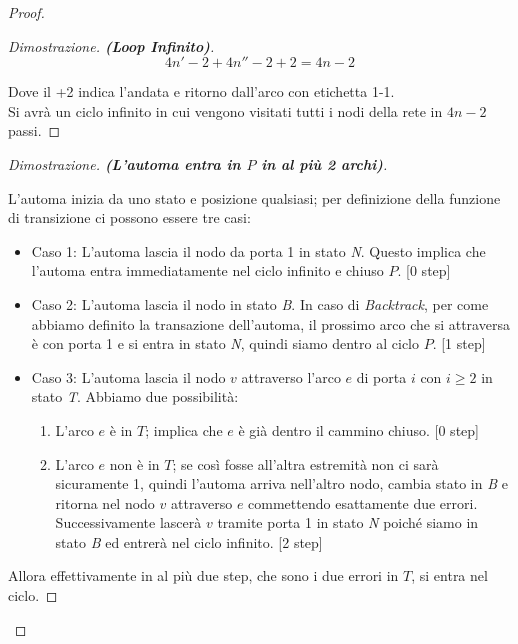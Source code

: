 \begin{proof}
\begin{proof}[Dimostrazione. \textbf{(Loop Infinito)}]
        $$
            4n'-2 + 4n''-2 + 2 = 4n -2
        $$

        Dove il +2 indica l'andata e ritorno dall'arco
        con etichetta 1-1.\\
        Si avrà un ciclo infinito in cui vengono visitati tutti i nodi della
        rete in $4n -2$ passi.
    \end{proof}
    \begin{proof}[Dimostrazione. \textbf{(L'automa entra in $P$ in al più 2 archi)}]\

        L'automa inizia da uno stato e posizione qualsiasi; per definizione della
        funzione di transizione ci possono essere tre casi:
        \begin{itemize}
            \item Caso 1: L'automa lascia il nodo da porta 1 in stato
                  \textit{N}. Questo implica che l'automa entra immediatamente
                  nel ciclo infinito e chiuso $P$. [0 step]
            \item Caso 2: L'automa lascia il nodo in stato \textit{B}. In caso
                  di \textit{Backtrack}, per come abbiamo definito la
                  transazione dell'automa, il prossimo arco che si attraversa è
                  con porta 1 e si entra in stato \textit{N}, quindi siamo
                  dentro al ciclo $P$. [1 step]
            \item Caso 3: L'automa lascia il nodo $v$ attraverso l'arco $e$ di porta
                  $i$ con $i\geq2$ in stato \textit{T}. Abbiamo due possibilità:
                  \begin{enumerate}
                      \item L'arco $e$ è in $T$; implica che $e$ è già dentro il
                            cammino chiuso. [0 step]
                      \item L'arco $e$ non è in $T$; se così fosse all'altra
                            estremità non ci sarà sicuramente 1, quindi l'automa
                            arriva nell'altro nodo, cambia stato in \textit{B} e
                            ritorna nel nodo $v$ attraverso $e$ commettendo
                            esattamente due errori. Successivamente lascerà $v$
                            tramite porta 1 in stato \textit{N} poiché siamo in
                            stato \textit{B} ed entrerà nel ciclo infinito. [2
                                    step]
                  \end{enumerate}
        \end{itemize}
        Allora effettivamente in al più due step, che sono i due errori in $T$, si
        entra nel ciclo.
    \end{proof}
\end{proof}

